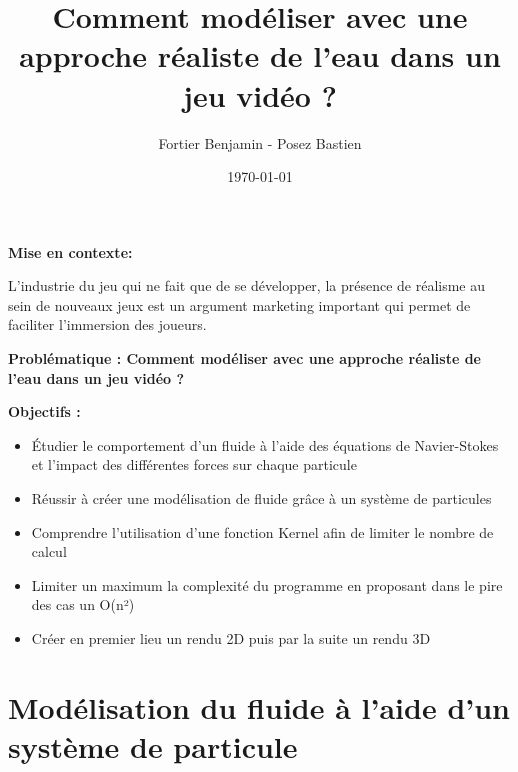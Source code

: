\documentclass{article}
\title{Comment modéliser avec une approche réaliste de l’eau dans un jeu vidéo ?}
\author{Fortier Benjamin - Posez Bastien}
\date{\today}
\begin{document}
\huge
\thispagestyle{landscape}
\maketitle


\newpage
\thispagestyle{landscape}
\vspace*{2pt}
\textbf{Mise en contexte:}
\begin{center}
    L’industrie du jeu qui ne fait que de se développer, la présence de réalisme au sein de nouveaux jeux est un argument marketing important qui permet de faciliter l’immersion des joueurs. 
\end{center}

\newpage
\thispagestyle{landscape}
\vspace*{\fill}
\begin{center}
    \textbf{Problématique : Comment modéliser avec une approche réaliste de l’eau dans un jeu vidéo ?}    
\end{center}
\vspace*{\fill}

\newpage
\thispagestyle{landscape}
\vspace*{\fill}
\textbf{Objectifs :}
\begin{center}
    \begin{itemize}
        \item Étudier le comportement d’un fluide à l’aide des équations de Navier-Stokes et l’impact des différentes forces sur chaque particule
        \item Réussir à créer une modélisation de fluide grâce à un système de particules
        \item Comprendre l’utilisation d’une fonction Kernel afin de limiter le nombre de calcul
        \item Limiter un maximum la complexité du programme en proposant dans le pire des cas un O(n²)
        \item Créer en premier lieu un rendu 2D puis par la suite un rendu 3D
    \end{itemize}
\end{center}
\vspace*{\fill}


\newpage
\thispagestyle{landscape}

\renewcommand{\contentsname}{\huge Plan :}
\tableofcontents


\newpage
\thispagestyle{landscape}

\section{Modélisation du fluide à l’aide d’un système de particule}
\end{document}
